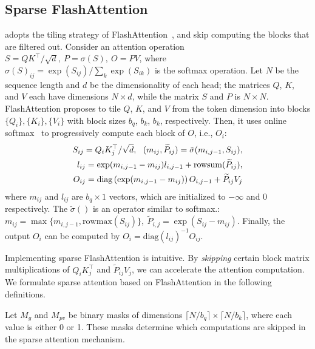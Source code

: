 \subsection{Sparse FlashAttention}  \label{sec:sparse_flashattn}
\vspace{-.25em}
\our adopts the tiling strategy of FlashAttention~\cite{dao2023flashattention}, and skip computing the blocks that are filtered out. Consider an attention operation $S = Q K^\top/\sqrt{d},~P = \sigma(S),~O = P V$, where $\sigma(S)_{ij} = \exp(S_{ij})/\sum_{k} \exp(S_{ik})$ is the softmax operation.
Let $N$ be the sequence length and $d$ be the dimensionality of each head; the matrices $Q$, $K$, and $V$ each have dimensions $N \times d$, while the matrix $S$ and $P$ is $N \times N$. 
FlashAttention proposes to tile $Q$, $K$, and $V$ from the token dimension into blocks $\{Q_i\}, \{K_i\}, \{V_i\}$ with block sizes $b_q$, $b_{k}$, $b_{k}$, respectively. Then, it uses online softmax~\cite{milakov2018online} to progressively compute each block of $O$, i.e., $O_i$:
\begin{align}
 S_{ij} = Q_i K_j^\top / \sqrt{d},~~(m_{ij}, \widetilde P_{ij}) = \tilde\sigma(m_{i,j-1}, S_{ij}), \notag \\
 l_{ij} = \exp(m_{i,j-1}-m_{ij}) l_{i,j-1} + \mathrm{rowsum}(\widetilde P_{ij}), \notag \\
 O_{ij}=\mathrm{diag}\left(\exp(m_{i,j-1}-m_{ij})\right) O_{i,j-1} + \widetilde P_{ij} V_j  \label{equ:flashsoftmax}
\end{align}
where $m_{ij}$ and $l_{ij}$ are $b_q \times 1$ vectors, which are initialized to $- \infty$ and $0$ respectively. The $\tilde \sigma()$ is an operator similar to softmax.: $m_{ij} = \max\{m_{i,j-1}, \mathrm{rowmax}(S_{ij})\},~\widetilde P_{i,j}=\exp(S_{ij}-m_{ij})$.
Finally, the output $O_i$ can be computed by $O_i = \mathrm{diag}(l_{ij})^{-1} O_{ij}$.

Implementing sparse FlashAttention is intuitive. By \emph{skipping} certain block matrix multiplications of $Q_i K_j^\top$ and $\widetilde{P}_{ij} V_j$, we can accelerate the attention computation.
We formulate sparse attention based on FlashAttention in the following definitions. 

\begin{definition}
    Let $M_{g}$ and $M_{pv}$ be binary masks of dimensions $\lceil N/b_q \rceil \times \lceil N/b_k \rceil$, where each value is either 0 or 1. These masks determine which computations are skipped in the sparse attention mechanism.
\end{definition}
    
